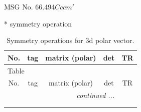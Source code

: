 \documentclass[fleqn,8pt]{jsarticle}
\begin{document}
\setcounter{MaxMatrixCols}{32}

\renewcommand{\tablename}{Table~}
\renewcommand{\figurename}{Figure~}
\begin{center}
\LARGE
MSG No. 66.494\quad$Cccm'$
\end{center}
* symmetry operation
\renewcommand{\arraystretch}{1.3}
\begin{longtable}{ccccc}
\caption{Symmetry operations for 3d polar vector.}
 \\
 \hline \hline
No. & tag & matrix (polar) & det & TR \\ \hline \endfirsthead

\multicolumn{4}{l}{\tablename\ \thetable{}} \\
 \hline \hline
No. & tag & matrix (polar) & det & TR \\ \hline \endhead

 \hline \hline
\multicolumn{4}{r}{\footnotesize\it continued ...} \\ \endfoot

 \hline \hline
\multicolumn{4}{r}{} \\ \endlastfoot


\end{longtable}
\end{document}
